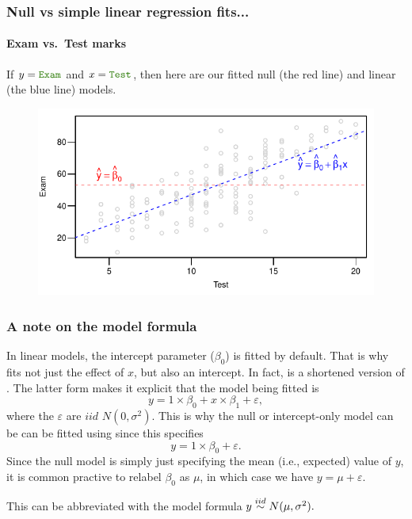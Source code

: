 \documentclass{beamer}\usepackage[]{graphicx}\usepackage[]{xcolor}
\begin{document}
\begin{frame}[fragile]
\frametitle{Null vs simple linear regression fits...}
\framesubtitle{Exam vs.\ Test marks}
If $y=\rcode{Exam}$ and $x=\rcode{Test}$, then here are our fitted null (the {\color{red} red} line) and linear (the {\color{blue} blue} line) models.




\begin{figure}
  \centering
  \includegraphics{figure/RC-H03-002}
\end{figure}

\end{frame}


\begin{frame}[fragile]
\frametitle{A note on the model formula}
In linear models, the intercept parameter ($\beta_0$) is fitted by default.
That is why  fits not just the effect of $x$, but also an intercept.
In fact, 
 is a shortened version of .
The latter form makes it explicit that the model being fitted is
\[
y =1 \times \beta_0 + x \times \beta_1  + \varepsilon,
\]
where the $\varepsilon$ are $iid$ $N(0,\sigma^2)$.
This is why the null or intercept-only model can be can be fitted using  since this specifies
\[
y = 1 \times \beta_0 + \varepsilon.
\]
Since the null model is simply just specifying the mean (i.e., expected) value of $y$, it is common practive to relabel $\beta_0$ as $\mu$, in which case we have
$y = \mu + \varepsilon$. 

This can be abbreviated with the model formula $y \stackrel{iid}{\sim} N(\mu, \sigma^{2}). $

\end{frame}
\end{document}
